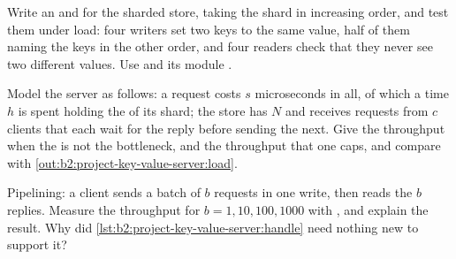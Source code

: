 \begin{exercise}[$\star\star\star$]\label{exo:b2:project-key-value-server:10}
Write an   and  for the sharded store, taking the shard  in increasing order, and test
them under load: four writers set two keys to the same value, half of them naming the keys in the other order, and four
readers check that they never see two different values. Use  and its module .
\end{exercise}

\begin{exercise}[$\star\star\star$]\label{exo:b2:project-key-value-server:11}
Model the server as follows: a request costs $s$ microseconds in all, of which a time $h$ is spent holding the
 of its shard; the store has $N$  and receives requests from $c$ clients that each wait for the reply before
sending the next. Give the throughput when the  is not the bottleneck, and the throughput that one  caps, and
compare with \cref{out:b2:project-key-value-server:load}.
\end{exercise}

\begin{exercise}[$\star\star\star$]\label{exo:b2:project-key-value-server:12}
Pipelining: a client sends a batch of $b$ requests in one write, then reads the $b$ replies. Measure the throughput for
$b = 1, 10, 100, 1000$ with , and explain the result. Why did \cref{lst:b2:project-key-value-server:handle}
need nothing new to support it?
\end{exercise}
